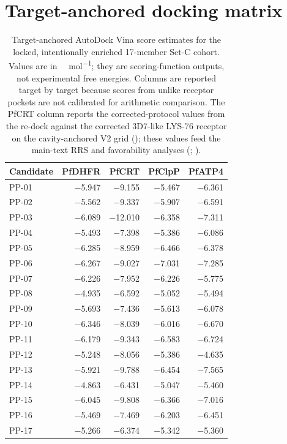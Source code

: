 \documentclass[journal=jcisd8,manuscript=suppinfo]{achemso}
\begin{document}
\section{Target-anchored docking matrix}\label{sec:sm_vina_matrix}
\begin{table}[h]
\centering
\caption{Target-anchored AutoDock Vina score estimates for the locked, intentionally enriched 17-member Set-C cohort. Values are in \si{\kilo\calorie\per\mole}; they are scoring-function outputs, not experimental free energies. Columns are reported target by target because scores from unlike receptor pockets are not calibrated for arithmetic comparison. The PfCRT column reports the corrected-protocol values from the re-dock against the corrected 3D7-like LYS-76 receptor on the cavity-anchored V2 grid (); these values feed the main-text RRS and favorability analyses (; ).}
\label{tab:vina}
\small
\begin{tabular}{@{}lrrrr@{}}
\toprule
Candidate & PfDHFR & PfCRT & PfClpP & PfATP4 \\
\midrule
PP-01 & \num{-5.947} & \num{-9.155} & \num{-5.467} & \num{-6.361} \\
PP-02 & \num{-5.562} & \num{-9.337} & \num{-5.907} & \num{-6.591} \\
PP-03 & \num{-6.089} & \num{-12.010} & \num{-6.358} & \num{-7.311} \\
PP-04 & \num{-5.493} & \num{-7.398} & \num{-5.386} & \num{-6.086} \\
PP-05 & \num{-6.285} & \num{-8.959} & \num{-6.466} & \num{-6.378} \\
PP-06 & \num{-6.267} & \num{-9.027} & \num{-7.031} & \num{-7.285} \\
PP-07 & \num{-6.226} & \num{-7.952} & \num{-6.226} & \num{-5.775} \\
PP-08 & \num{-4.935} & \num{-6.592} & \num{-5.052} & \num{-5.494} \\
PP-09 & \num{-5.693} & \num{-7.436} & \num{-5.613} & \num{-6.078} \\
PP-10 & \num{-6.346} & \num{-8.039} & \num{-6.016} & \num{-6.670} \\
PP-11 & \num{-6.179} & \num{-9.343} & \num{-6.583} & \num{-6.724} \\
PP-12 & \num{-5.248} & \num{-8.056} & \num{-5.386} & \num{-4.635} \\
PP-13 & \num{-5.921} & \num{-9.788} & \num{-6.454} & \num{-7.565} \\
PP-14 & \num{-4.863} & \num{-6.431} & \num{-5.047} & \num{-5.460} \\
PP-15 & \num{-6.045} & \num{-9.808} & \num{-6.366} & \num{-7.016} \\
PP-16 & \num{-5.469} & \num{-7.469} & \num{-6.203} & \num{-6.451} \\
PP-17 & \num{-5.266} & \num{-6.374} & \num{-5.342} & \num{-5.360} \\
\bottomrule
\end{tabular}
\end{table}
\end{document}
